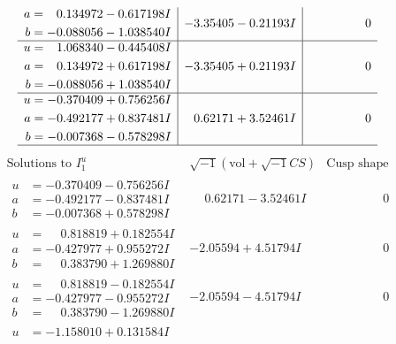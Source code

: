 \documentclass[1p]{elsarticle_modified}
\theoremstyle{definition}
\newcommand{\I}{\sqrt{-1}}
\begin{document}
$$\begin{array}{c|c|c}
\begin{aligned}
a &= \phantom{-}0.134972 - 0.617198 I \\
b &= -0.088056 - 1.038540 I\end{aligned}
 & -3.35405 - 0.21193 I & \phantom{-0.000000 } 0 \\ \hline\begin{aligned}
u &= \phantom{-}1.068340 - 0.445408 I \\
a &= \phantom{-}0.134972 + 0.617198 I \\
b &= -0.088056 + 1.038540 I\end{aligned}
 & -3.35405 + 0.21193 I & \phantom{-0.000000 } 0 \\ \hline\begin{aligned}
u &= -0.370409 + 0.756256 I \\
a &= -0.492177 + 0.837481 I \\
b &= -0.007368 - 0.578298 I\end{aligned}
 & \phantom{-}0.62171 + 3.52461 I & \phantom{-0.000000 } 0\\
 \hline 
 \end{array}$$\newpage$$\begin{array}{c|c|c}  
\text{Solutions to }I^u_{1}& \I (\text{vol} + \sqrt{-1}CS) & \text{Cusp shape}\\
 \hline 
\begin{aligned}
u &= -0.370409 - 0.756256 I \\
a &= -0.492177 - 0.837481 I \\
b &= -0.007368 + 0.578298 I\end{aligned}
 & \phantom{-}0.62171 - 3.52461 I & \phantom{-0.000000 } 0 \\ \hline\begin{aligned}
u &= \phantom{-}0.818819 + 0.182554 I \\
a &= -0.427977 + 0.955272 I \\
b &= \phantom{-}0.383790 + 1.269880 I\end{aligned}
 & -2.05594 + 4.51794 I & \phantom{-0.000000 } 0 \\ \hline\begin{aligned}
u &= \phantom{-}0.818819 - 0.182554 I \\
a &= -0.427977 - 0.955272 I \\
b &= \phantom{-}0.383790 - 1.269880 I\end{aligned}
 & -2.05594 - 4.51794 I & \phantom{-0.000000 } 0 \\ \hline\begin{aligned}
u &= -1.158010 + 0.131584 I \\

\end{aligned}
\end{array}$$
\end{document}
